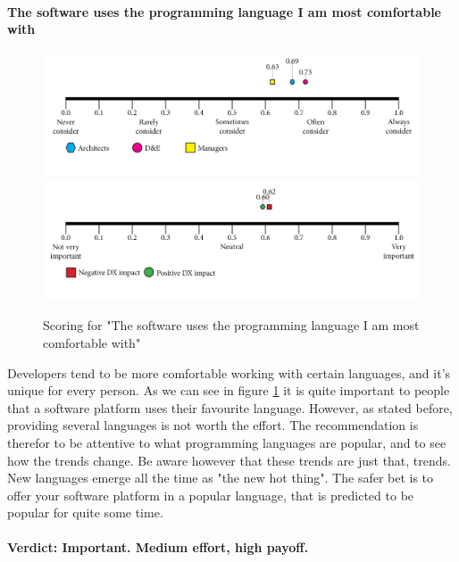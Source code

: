     \paragraph{The software uses the programming language I am most comfortable with}
    \begin{figure}[H]
        \centering
        \includegraphics[width=\linewidth]{scorelines/aspect15.png}
        \includegraphics[width=\linewidth]{dxscorelines/dxaspect15.png}
        \caption{Scoring for "The software uses the programming language I am most comfortable with"}
        \label{fig:aspect15}
    \end{figure}
    Developers tend to be more comfortable working with certain languages, and it's unique for every person. As we can see in figure \ref{fig:aspect15} it is quite important to people that a software platform uses their favourite language. However, as stated before, providing several languages is not worth the effort. The recommendation is therefor to be attentive to what programming languages are popular, and to see how the trends change. Be aware however that these trends are just that, trends. New languages emerge all the time as "the new hot thing". The safer bet is to offer your software platform in a popular language, that is predicted to be popular for quite some time. \\ \\
    \textbf{Verdict: Important. Medium effort, high payoff.}
    
